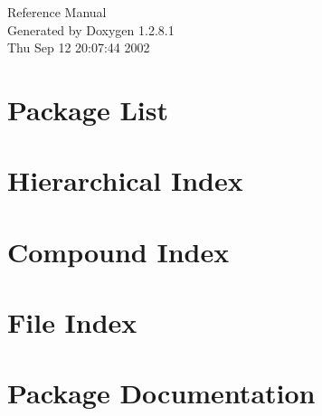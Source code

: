 \documentclass[a4paper]{book}
\begin{document}
\begin{titlepage}
\vspace*{7cm}
\begin{center}
{\Large Reference Manual}\\
\vspace*{1cm}
{\large Generated by Doxygen 1.2.8.1}\\
\vspace*{0.5cm}
{\small Thu Sep 12 20:07:44 2002}\\
\end{center}
\end{titlepage}
\clearemptydoublepage
{}
\tableofcontents
\clearemptydoublepage
{}
\chapter{Package List}

\chapter{Hierarchical Index}

\chapter{Compound Index}

\chapter{File Index}

\chapter{Package Documentation}



\end{document}

